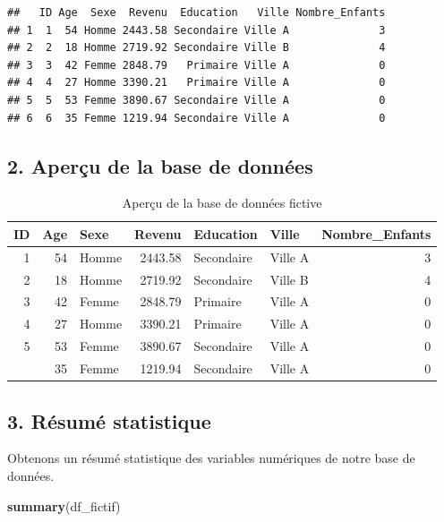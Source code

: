 \documentclass[
]{article}
\newenvironment{Shaded}{\begin{snugshade}}{\end{snugshade}}
\newcommand{\FunctionTok}[1]{\textcolor[rgb]{0.13,0.29,0.53}{\textbf{#1}}}
\newcommand{\NormalTok}[1]{#1}
\begin{document}
\begin{verbatim}
##   ID Age  Sexe  Revenu  Education   Ville Nombre_Enfants
## 1  1  54 Homme 2443.58 Secondaire Ville A              3
## 2  2  18 Homme 2719.92 Secondaire Ville B              4
## 3  3  42 Femme 2848.79   Primaire Ville A              0
## 4  4  27 Homme 3390.21   Primaire Ville A              0
## 5  5  53 Femme 3890.67 Secondaire Ville A              0
## 6  6  35 Femme 1219.94 Secondaire Ville A              0
\end{verbatim}

\hypertarget{aperuxe7u-de-la-base-de-donnuxe9es}{%
\subsection{2. Aperçu de la base de
données}\label{aperuxe7u-de-la-base-de-donnuxe9es}}

\begin{longtable}[t]{rrlrllr}
\caption{\label{tab:aperçu-base}Aperçu de la base de données fictive}\\
\toprule
ID & Age & Sexe & Revenu & Education & Ville & Nombre\_Enfants\\
\midrule
1 & 54 & Homme & 2443.58 & Secondaire & Ville A & 3\\
2 & 18 & Homme & 2719.92 & Secondaire & Ville B & 4\\
3 & 42 & Femme & 2848.79 & Primaire & Ville A & 0\\
4 & 27 & Homme & 3390.21 & Primaire & Ville A & 0\\
5 & 53 & Femme & 3890.67 & Secondaire & Ville A & 0\\
\addlinespace
6 & 35 & Femme & 1219.94 & Secondaire & Ville A & 0\\
\bottomrule
\end{longtable}

\hypertarget{ruxe9sumuxe9-statistique}{%
\subsection{3. Résumé statistique}\label{ruxe9sumuxe9-statistique}}

Obtenons un résumé statistique des variables numériques de notre base de
données.

\begin{Shaded}
\begin{Highlighting}[]
\FunctionTok{summary}\NormalTok{(df\_fictif)}
\end{Highlighting}
\end{Shaded}
\end{document}

